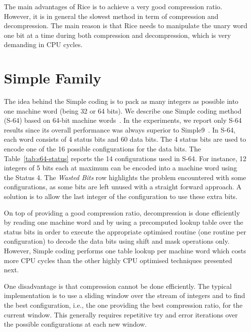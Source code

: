 The main advantages of Rice is to achieve a very good compression ratio.
However, it is in general the slowest method in term of compression and
decompression. The main reason is that Rice needs to manipulate the unary word
one bit at a time during both compression and decompression, which is very
demanding in CPU cycles.

\section{Simple Family}

The idea behind the Simple coding is to pack as many integers as possible into
one machine word (being 32 or 64 bits). We describe one Simple coding method
(S-64) based on 64-bit machine words~\cite{anh:2010:simple64}. In the
experiments, we report only S-64 results since its overall performance was
always superior to Simple9~\cite{anh:2005:simple9}. In S-64, each word
consists of 4 status bits and 60 data bits. The 4 status bits are used to
encode one of the 16 possible configurations for the data bits. The
Table~\ref{tab:s64-status} reports the 14 configurations used in S-64. For
instance, 12 integers of 5 bits each at maximum can be encoded into a
machine word using the Status 4. The \emph{Wasted Bits} row highlights the
problem encountered with some configurations, as some bits are left unused with
a straight forward approach. A solution is to allow the last integer of the
configuration to use these extra bits.

On top of providing a good compression ratio, decompression is done efficiently
by reading one machine word and by using a precomputed lookup table over the
status bits in order to execute the appropriate optimised routine (one routine
per configuration) to decode the data bits using shift and mask operations
only. However, Simple coding performs one table lookup per machine word which
costs more CPU cycles than the other highly CPU optimised techniques presented
next.

One disadvantage is that compression cannot be done efficiently. The typical
implementation is to use a sliding window over the stream of integers and to
find the best configuration, i.e., the one providing the best compression
ratio, for the current window. This generally requires repetitive try and
error iterations over the possible configurations at each new window.


